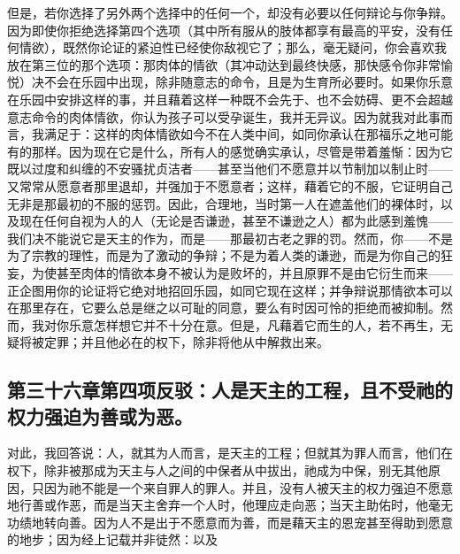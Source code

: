 但是，若你选择了另外两个选择中的任何一个，却没有必要以任何辩论与你争辩。因为即使你拒绝选择第四个选项（其中所有服从的肢体都享有最高的平安，没有任何情欲），既然你论证的紧迫性已经使你敌视它了；那么，毫无疑问，你会喜欢我放在第三位的那个选项：那肉体的情欲（其冲动达到最终快感，那快感令你非常愉悦）决不会在乐园中出现，除非随意志的命令，且是为生育所必要时。如果你乐意在乐园中安排这样的事，并且藉着这样一种既不会先于、也不会妨碍、更不会超越意志命令的肉体情欲，你认为孩子可以受孕诞生，我并无异议。因为就我对此事而言，我满足于：这样的肉体情欲如今不在人类中间，如同你承认在那福乐之地可能有的那样。因为现在它是什么，所有人的感觉确实承认，尽管是带着羞惭：因为它既以过度和纠缠的不安骚扰贞洁者——甚至当他们不愿意并以节制加以制止时——又常常从愿意者那里退却，并强加于不愿意者；这样，藉着它的不服，它证明自己无非是那最初的不服的惩罚。因此，合理地，当时第一人在遮盖他们的裸体时，以及现在任何自视为人的人（无论是否谦逊，甚至不谦逊之人）都为此感到羞愧——我们决不能说它是天主的作为，而是——那最初古老之罪的罚。然而，你——不是为了宗教的理性，而是为了激动的争辩；不是为着人类的谦逊，而是为你自己的狂妄，为使甚至肉体的情欲本身不被认为是败坏的，并且原罪不是由它衍生而来——正企图用你的论证将它绝对地招回乐园，如同它现在这样；并争辩说那情欲本可以在那里存在，它要么总是继之以可耻的同意，要么有时因可怜的拒绝而被抑制。然而，我对你乐意怎样想它并不十分在意。但是，凡藉着它而生的人，若不再生，无疑将被定罪；并且他必在的权下，除非将他从中解救出来。\par


\subsection{第三十六章第四项反驳：人是天主的工程，且不受祂的权力强迫为善或为恶。}

对此，我回答说：人，就其为人而言，是天主的工程；但就其为罪人而言，他们在权下，除非被那成为天主与人之间的中保者从中拔出，祂成为中保，别无其他原因，只因为祂不能是一个来自罪人的罪人。并且，没有人被天主的权力强迫不愿意地行善或作恶，而是当天主舍弃一个人时，他理应走向恶；当天主助佑时，他毫无功绩地转向善。因为人不是出于不愿意而为善，而是藉天主的恩宠甚至得助到愿意的地步；因为经上记载并非徒然：以及\par

